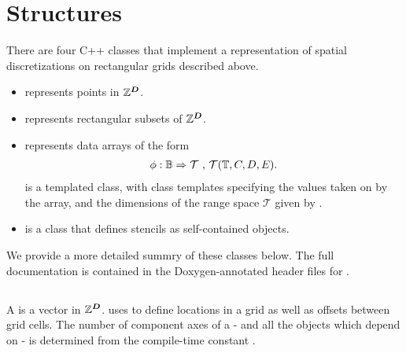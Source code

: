 \documentclass[12pt]{article}
\begin{document}
\section{\libname Structures}

There are four C++ classes that implement a representation of spatial discretizations on rectangular grids described above.
\begin{itemize}
\item
{} represents points in $\mathbb{Z}^{\boldsymbol{D}}$.
\item
{} represents rectangular subsets of $\mathbb{Z}^{\boldsymbol{D}}$.
\item
{} represents data arrays of the form
\begin{gather*}
\phi:\mathbb{B} \Rightarrow \mathcal{T} \hbox{ , } \mathcal{T}(\mathbb{T},C,D,E).
\end{gather*}
 is a templated class, with class templates specifying the values taken on by the array, and the dimensions of the range space $\mathcal{T}$ given by . 
\item
{} is a class that defines stencils as self-contained objects.
\end{itemize}
We provide a more detailed summry of these classes below. The full documentation is contained in the Doxygen-annotated header files for \libname.
\subsection{}

A  is a vector in $\mathbb{Z}^{\boldsymbol{D}}$. \libname uses  to define locations in a grid as well as offsets between grid cells. The number of component axes of a  - and all the objects which depend on  - is determined from the compile-time constant . 
\end{document}
